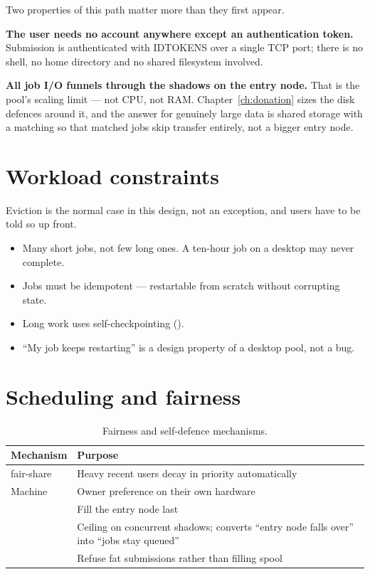 Two properties of this path matter more than they first appear.

\textbf{The user needs no account anywhere except an authentication token.}
Submission is authenticated with IDTOKENS over a single TCP port; there is no
shell, no home directory and no shared filesystem involved.

\textbf{All job I/O funnels through the shadows on the entry node.} That is the
pool's scaling limit --- not CPU, not RAM. Chapter~\ref{ch:donation} sizes the
disk defences around it, and the answer for genuinely large data is shared
storage with a matching  so that matched jobs skip
transfer entirely, not a bigger entry node.

\section{Workload constraints}

Eviction is the normal case in this design, not an exception, and users have to
be told so up front.

\begin{itemize}
  \item Many short jobs, not few long ones. A ten-hour job on a desktop may never complete.
  \item Jobs must be idempotent --- restartable from scratch without corrupting state.
  \item Long work uses self-checkpointing ().
  \item ``My job keeps restarting'' is a design property of a desktop pool, not a bug.
\end{itemize}

\section{Scheduling and fairness}

\begin{table}[H]
\centering
\begin{tabularx}{\textwidth}{L{0.30\textwidth} Y}
\toprule
\textbf{Mechanism} & \textbf{Purpose} \\
\midrule
{} fair-share & Heavy recent users decay in priority automatically \\
Machine  & Owner preference on their own hardware \\
 & Fill the entry node last \\
 & Ceiling on concurrent shadows; converts ``entry node falls over'' into ``jobs stay queued'' \\
 & Refuse fat submissions rather than filling spool \\
\bottomrule
\end{tabularx}
\caption{Fairness and self-defence mechanisms.}
\end{table}

